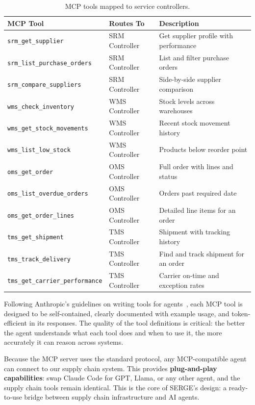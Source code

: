 \documentclass[12pt,a4paper]{report}
\begin{document}
\begin{table}[H]
\centering\small
\caption{MCP tools mapped to service controllers.}
\begin{tabularx}{\textwidth}{@{} l l X @{}}
\toprule
\textbf{MCP Tool} & \textbf{Routes To} & \textbf{Description} \\
\midrule
\texttt{srm\_get\_supplier}           & SRM Controller & Get supplier profile with performance \\
\texttt{srm\_list\_purchase\_orders}   & SRM Controller & List and filter purchase orders \\
\texttt{srm\_compare\_suppliers}       & SRM Controller & Side-by-side supplier comparison \\
\texttt{wms\_check\_inventory}         & WMS Controller & Stock levels across warehouses \\
\texttt{wms\_get\_stock\_movements}    & WMS Controller & Recent stock movement history \\
\texttt{wms\_list\_low\_stock}         & WMS Controller & Products below reorder point \\
\texttt{oms\_get\_order}               & OMS Controller & Full order with lines and status \\
\texttt{oms\_list\_overdue\_orders}    & OMS Controller & Orders past required date \\
\texttt{oms\_get\_order\_lines}        & OMS Controller & Detailed line items for an order \\
\texttt{tms\_get\_shipment}            & TMS Controller & Shipment with tracking history \\
\texttt{tms\_track\_delivery}          & TMS Controller & Find and track shipment for an order \\
\texttt{tms\_get\_carrier\_performance} & TMS Controller & Carrier on-time and exception rates \\
\bottomrule
\end{tabularx}
\end{table}

Following Anthropic's guidelines on writing tools for agents~\cite{anthropic2025writingtools}, each MCP tool is designed to be self-contained, clearly documented with example usage, and token-efficient in its responses. The quality of the tool definitions is critical: the better the agent understands what each tool does and when to use it, the more accurately it can reason across systems.

Because the MCP server uses the standard protocol, any MCP-compatible agent can connect to our supply chain system. This provides \textbf{plug-and-play capabilities}: swap Claude Code for GPT, Llama, or any other agent, and the supply chain tools remain identical. This is the core of SERGE's design: a ready-to-use bridge between supply chain infrastructure and AI agents.
\end{document}
